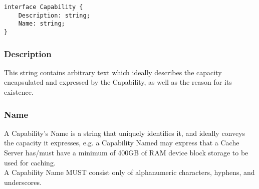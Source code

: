 \begin{codelisting}
\begin{verbatim}
interface Capability {
	Description: string;
	Name: string;
}
\end{verbatim}
\end{codelisting}

\subsubsection{Description}
This string contains arbitrary text which ideally describes the capacity
encapsulated and expressed by the Capability, as well as the reason for its
existence.

\subsubsection{Name}
A Capability's Name is a string that uniquely identifies it, and ideally
conveys the capacity it expresses, e.g. a Capability Named  may
express that a Cache Server has/must have a minimum of 400GB of RAM device
block storage to be used for caching.\\
A Capability Name MUST consist only of alphanumeric characters, hyphens, and
underscores.


